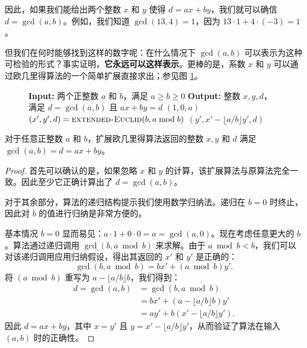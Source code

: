 因此，如果我们能给出两个整数 $x$ 和 $y$ 使得 $d = ax + by$，我们就可以确信 $d = \gcd(a, b)$。例如，我们知道 $\gcd(13, 4) = 1$，因为 $13 \cdot 1 + 4 \cdot (-3) = 1$。

但我们在何时能够找到这样的数字呢：在什么情况下 $\gcd(a, b)$ 可以表示为这种可检验的形式？事实证明，\textbf{它永远可以这样表示}。更棒的是，系数 $x$ 和 $y$ 可以通过欧几里得算法的一个简单扩展直接求出；参见图 \ref{fig:ext_euclid}。

\begin{figure}[htbp]
\centering
\begin{tcolorbox}[colback=white,colframe=gray!50!black,title={\textbf{图 1.6}\quad 扩展欧几里得算法 (Extended Euclid algorithm)}]
\begin{algorithmic}[1]
    \State \textbf{Input:} 两个正整数 $a$ 和 $b$，满足 $a \ge b \ge 0$
    \State \textbf{Output:} 整数 $x, y, d$，满足 $d = \gcd(a, b)$ 且 $ax + by = d$
     \Return $(1, 0, a)$ \EndIf
    \State $(x', y', d) = \Call{extended-Euclid}{b, a \bmod b}$
    \State \Return $(y', x' - \lfloor a/b \rfloor y', d)$
\EndFunction
\end{algorithmic}
\end{tcolorbox}
\label{fig:ext_euclid}
\end{figure}

\begin{lemma}
对于任意正整数 $a$ 和 $b$，扩展欧几里得算法返回的整数 $x, y$ 和 $d$ 满足 $\gcd(a, b) = d = ax + by$。
\end{lemma}

\begin{proof}
首先可以确认的是，如果忽略 $x$ 和 $y$ 的计算，该扩展算法与原算法完全一致。因此至少它正确计算出了 $d = \gcd(a, b)$。

对于其余部分，算法的递归结构提示我们使用数学归纳法。递归在 $b = 0$ 时终止，因此对 $b$ 的值进行归纳是非常方便的。

基本情况 $b = 0$ 显而易见：$a \cdot 1 + 0 \cdot 0 = a = \gcd(a, 0)$。现在考虑任意更大的 $b$。算法通过递归调用 $\gcd(b, a \bmod b)$ 来求解。由于 $a \bmod b < b$，我们可以对该递归调用应用归纳假设，得出其返回的 $x'$ 和 $y'$ 是正确的：
\[
\gcd(b, a \bmod b) = b x' + (a \bmod b) y'.
\]
将 $(a \bmod b)$ 重写为 $a - \lfloor a/b \rfloor b$，我们得到：
\begin{align*}
d = \gcd(a, b) &= \gcd(b, a \bmod b) \\
&= b x' + (a - \lfloor a/b \rfloor b) y' \\
&= a y' + b (x' - \lfloor a/b \rfloor y').
\end{align*}
因此 $d = ax + by$，其中 $x = y'$ 且 $y = x' - \lfloor a/b \rfloor y'$，从而验证了算法在输入 $(a, b)$ 时的正确性。
\end{proof}

